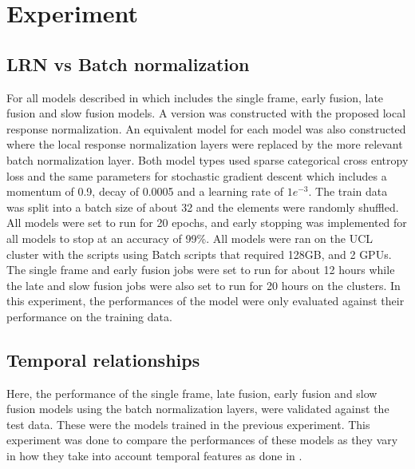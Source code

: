 \chapter{Experiment}


\section{LRN vs Batch normalization}
For all models described in \citep{KarpathyCVPR14} which includes the single frame, early fusion, late fusion and slow fusion models. A version was constructed with the proposed local response normalization.  An equivalent model for each model was also constructed where the  local response normalization layers were replaced by the more relevant batch normalization layer.
Both model types used sparse categorical cross entropy loss and the same parameters for stochastic gradient descent which includes a   momentum of 0.9,  decay of 0.0005 and a learning rate of $1e^{-3}$.  
The train data was split into a batch size of about 32 and the elements were randomly shuffled.
All models were set to run for 20 epochs, and early stopping was implemented for all models to stop at an accuracy of 99\%. All models were ran on the UCL cluster with the scripts using Batch scripts that required 128GB, and 2 GPUs. The single frame and early fusion jobs were set to run for about 12 hours while the late and slow fusion jobs were also set to run for 20 hours on the clusters.
In this experiment, the performances of the model were only evaluated against their performance on the training data.

\section{Temporal relationships}
Here, the performance of the single frame, late fusion, early fusion and slow fusion models using the batch normalization layers,  were validated against the test data. These were the models trained in the previous experiment.  This experiment was done to compare the performances of these models as they vary in how they take into account temporal features as done in \citep{KarpathyCVPR14}.

